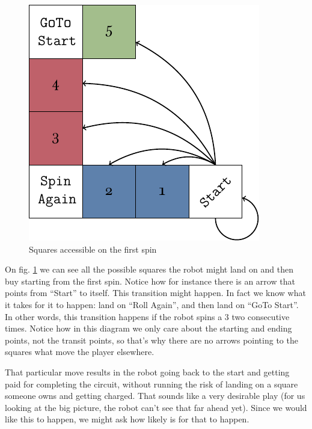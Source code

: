 \begin{figure}[h]
	\centering
	\includegraphics[width=.75\textwidth]{img/diagram-start.pdf}
	\caption{Squares accessible on the first spin}
	\label{fig:miniopoly-diagram-start}
\end{figure}

On fig. \ref{fig:miniopoly-diagram-start} we can see all the 
possible squares the robot might land on and then buy starting 
from the first spin. Notice how for instance there is an arrow 
that points from ``Start'' to itself. This transition might 
happen. In fact we know what it takes for it to happen: land on 
``Roll Again'', and then land on ``GoTo Start''. In other words, 
this transition happens if the robot spins a 3 two consecutive 
times. Notice how in this diagram we only care about the 
starting and ending points, not the transit points, so that's 
why there are no arrows pointing to the squares what move the 
player elsewhere. 

That particular move results in the robot going back to the 
start and getting paid for completing the circuit, without 
running the risk of landing on a square someone owns and getting 
charged. That sounds like a very desirable play (for us looking 
at the big picture, the robot can't see that far ahead yet).  
Since we would like this to happen, we might ask how likely is 
for that to happen.

